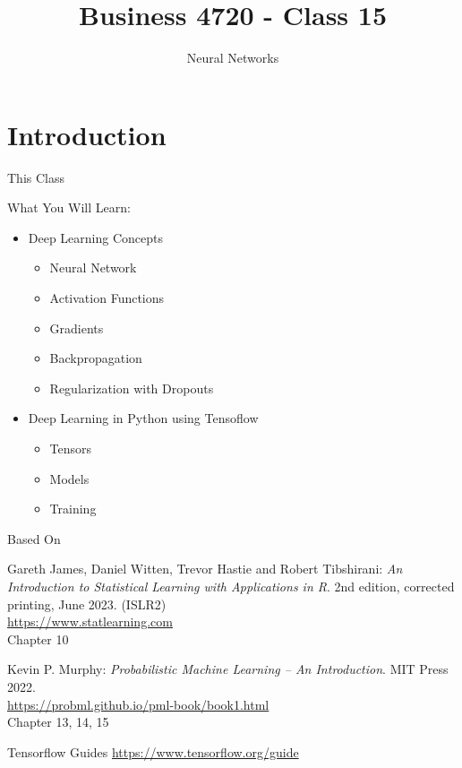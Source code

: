 \documentclass[ignorenonframetext,xcolor=x11names]{beamer}
\title{Business 4720 - Class 15}
\subtitle{Neural Networks}
\begin{document}
\begin{frame}[label=full]{}
  \titlepage
  \footnotesize
  
\end{frame}

\section{Introduction}

\begin{frame}[label=full]{This Class}

\begin{block}{What You Will Learn:}
\begin{itemize}
  \item Deep Learning Concepts
  \begin{itemize}
     \item Neural Network
     \item Activation Functions
     \item Gradients
     \item Backpropagation
     \item Regularization with Dropouts
 \end{itemize}
 \item Deep Learning in Python using Tensoflow
 \begin{itemize}
     \item Tensors
     \item Models
     \item Training
  \end{itemize}
\end{itemize}
\end{block}
\end{frame}

\begin{frame}[label=full]{Based On}
\small
\begin{block}{}
Gareth James, Daniel Witten, Trevor Hastie and Robert Tibshirani: \emph{An Introduction to Statistical Learning with Applications in R}. 2nd edition, corrected printing, June 2023. (ISLR2) \\
\vspace{1mm}
\url{https://www.statlearning.com} \\
\vspace{1mm}
Chapter 10
\end{block}

\begin{block}{}
Kevin P. Murphy: \emph{Probabilistic Machine Learning -- An Introduction}. MIT Press 2022. \\
\vspace{1mm}
\url{https://probml.github.io/pml-book/book1.html} \\
\vspace{1mm}
Chapter 13, 14, 15
\end{block}

\begin{block}{Tensorflow Guides}
\url{https://www.tensorflow.org/guide}
\end{block}
\end{frame}
\end{document}
